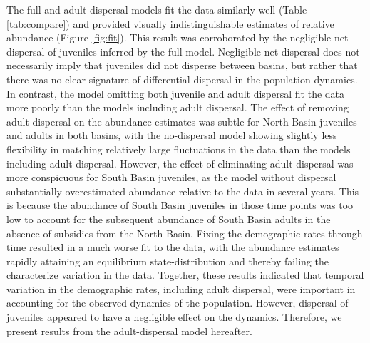 \documentclass[11pt]{article}
\begin{document}
The full and adult-dispersal models fit the data similarly well (Table \ref{tab:compare})
and provided visually indistinguishable estimates of
relative abundance (Figure \ref{fig:fit}).
This result was corroborated by the negligible net-dispersal
of juveniles inferred by the full model.
Negligible net-dispersal does not necessarily imply
that juveniles did not disperse between basins,
but rather that there was no clear signature of differential dispersal
in the population dynamics.
In contrast, the model omitting both juvenile and adult dispersal fit
the data more poorly than the models including adult dispersal.
The effect of removing adult dispersal on the abundance estimates was subtle
for North Basin juveniles and adults in both basins,
with the no-dispersal model showing slightly less flexibility in matching
relatively large fluctuations in the data than the models including adult dispersal.
However,
the effect of eliminating adult dispersal was more conspicuous for South Basin juveniles,
as the model without dispersal substantially overestimated abundance relative to the data
in several years.
This is because the abundance of South Basin juveniles in those time points was too low
to account for the subsequent abundance of South Basin adults
in the absence of subsidies from the North Basin.
Fixing the demographic rates through time resulted in a much worse fit to the data,
with the abundance estimates rapidly attaining an equilibrium state-distribution
and thereby failing the characterize variation in the data.
Together, these results indicated that temporal variation in the demographic rates,
including adult dispersal, were important in accounting
for the observed dynamics of the population.
However, dispersal of juveniles appeared to have a negligible effect on the dynamics.
Therefore, we present results from the adult-dispersal model hereafter.
\end{document}
